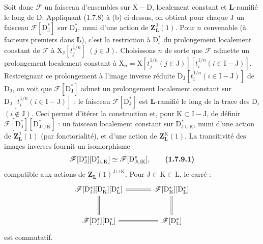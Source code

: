\documentclass[11pt,leqno]{article}
\begin{document}
Soit donc \(\mathscr{F}\) un faisceau d’ensembles sur \(\mathrm{X}-\mathrm{D}\), localement constant et \(\mathbf{L}\)-ramifié le long de \(\mathrm{D}\). Appliquant (1.7.8) à (b) ci-dessus, on obtient pour chaque \(\mathrm{J}\) un faisceau \(\mathscr{F}[\mathrm{D}_{\mathrm{J}}^*]\) sur \(\mathrm{D}_{\mathrm{J}}^*\), muni d’une action de \(\mathbf{Z}_{\mathbf{L}}^{\mathrm{J}}(1)\). Pour \(n\) convenable (à facteurs premiers dans \(\mathbf{L}\)), c’est la restriction à \(\mathrm{D}_{\mathrm{J}}^*\) du prolongement localement constant de \(\mathscr{F}\) à \(\mathrm{X}_{\mathrm{J}}[t_j^{1/n}]\) \((j\in\mathrm{J})\). Choisissons \(n\) de sorte que \(\mathscr{F}\) admette un prolongement localement constant à \(\mathrm{X}_n=\mathrm{X}[t_j^{1/n}(j\in\mathrm{J})][t_i^{1/n}(i\in\mathrm{I}-\mathrm{J})]\). Restreignant ce prolongement à l’image inverse réduite \(\mathrm{D}_{\mathrm{J}}[t_i^{1/n}(i\in\mathrm{I}-\mathrm{J})]\) de \(\mathrm{D}_{\mathrm{J}}\), on voit que \(\mathscr{F}[\mathrm{D}_{\mathrm{J}}^*]\) admet un prolongement localement constant sur \(\mathrm{D}_{\mathrm{J}}[t_i^{1/n}(i\in\mathrm{I}-\mathrm{J})]\) : le faisceau \(\mathscr{F}[\mathrm{D}_{\mathrm{J}}^*]\) est \(\mathbf{L}\)-ramifié le long de la trace des \(\mathrm{D}_i\) \((i\notin\mathrm{J})\). Ceci permet d’itérer la construction et, pour \(\mathrm{K}\subset\mathrm{I}-\mathrm{J}\), de définir \(\mathscr{F}[\mathrm{D}_{\mathrm{J}}^*][\mathrm{D}_{\mathrm{J}\cup\mathrm{K}}^*]\) : un faisceau localement constant sur \(\mathrm{D}_{\mathrm{J}\cup\mathrm{K}}^*\), muni d’une action de \(\mathbf{Z}_{\mathbf{L}}^{\mathrm{J}}(1)\) (par fonctorialité), et d’une action de \(\mathbf{Z}_{\mathbf{L}}^{\mathrm{K}}(1)\). La transitivité des images inverses fournit un isomorphisme
\[
\mathscr{F}[\mathrm{D}_{\mathrm{J}}^*][\mathrm{D}_{\mathrm{J}\cup\mathrm{K}}^*]
\simeq
\mathscr{F}[\mathrm{D}_{\mathrm{J}\cup\mathrm{K}}^*],
\tag*{\textbf{(1.7.9.1)}}
\]
compatible aux actions de \(\mathbf{Z}_{\mathbf{L}}(1)^{\mathrm{J}\cup\mathrm{K}}\). Pour \(\mathrm{J}\subset\mathrm{K}\subset\mathrm{L}\), le carré :
\[
\begin{tikzcd}[ampersand replacement=\&, row sep=large, column sep=large]
\mathscr{F}[\mathrm{D}_{\mathrm{J}}^*][\mathrm{D}_{\mathrm{K}}^*][\mathrm{D}_{\mathrm{L}}^*]
  \arrow[r, equal] \arrow[d, equal]
\&
\mathscr{F}[\mathrm{D}_{\mathrm{K}}^*][\mathrm{D}_{\mathrm{L}}^*]
  \arrow[d, equal]
\\
\mathscr{F}[\mathrm{D}_{\mathrm{J}}^*][\mathrm{D}_{\mathrm{L}}^*]
  \arrow[r, equal]
\&
\mathscr{F}[\mathrm{D}_{\mathrm{L}}^*]
\end{tikzcd}
\]
est commutatif.
\end{document}
